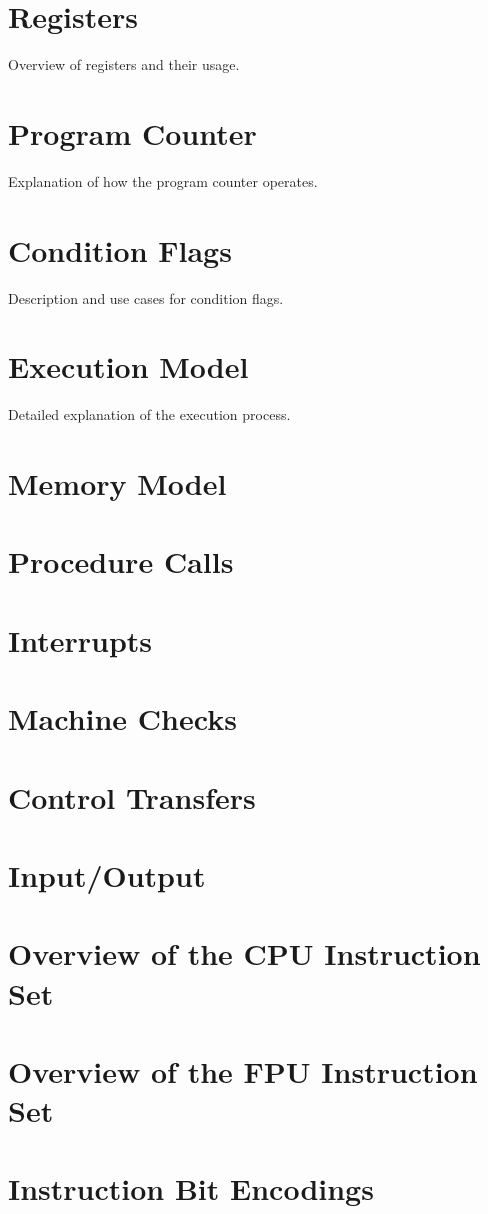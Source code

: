 \documentclass[11pt,a4paper,oneside]{book}
\begin{document}
\mainmatter

\chapter{Registers}
Overview of registers and their usage.

\chapter{Program Counter}
Explanation of how the program counter operates.

\chapter{Condition Flags}
Description and use cases for condition flags.

\chapter{Execution Model}
Detailed explanation of the execution process.

\chapter{Memory Model}

\chapter{Procedure Calls}

\chapter{Interrupts}

\chapter{Machine Checks}

\chapter{Control Transfers}

\chapter{Input/Output}

\chapter{Overview of the CPU Instruction Set}

\chapter{Overview of the FPU Instruction Set}

\chapter{Instruction Bit Encodings}
\end{document}
